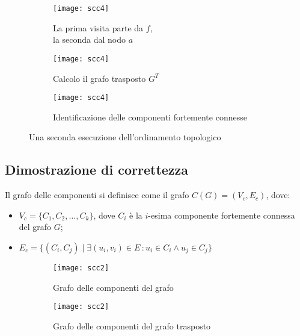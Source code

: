 \begin{figure}[H]\centering
	\begin{subfigure}[t]{.3\textwidth}
		\texttt{[image: scc4]}
		\caption{La prima visita parte da \(f\),\\la seconda dal nodo \(a\)}
	\end{subfigure}\hfill
	\begin{subfigure}[t]{.3\textwidth}
		\texttt{[image: scc4]}
		\caption{Calcolo il grafo trasposto \(G^T\)}
	\end{subfigure}\hfill
	\begin{subfigure}[t]{.3\textwidth}
		\texttt{[image: scc4]}
		\caption{Identificazione delle componenti fortemente connesse}
	\end{subfigure}
	\caption[]{Una seconda esecuzione dell'ordinamento topologico}
\end{figure}

\clearpage
\subsection{Dimostrazione di correttezza}

\begin{definition}
Il grafo delle componenti si definisce come il grafo \(C(G) = (V_c, E_c)\), dove:
\begin{itemize}
	\item \(V_c = \{C_1, C_2, \dots, C_k\}\), dove \(C_i\) è la \(i\)-esima componente fortemente connessa del grafo \(G\);
	\item \(E_c = \{(C_i, C_j) \mid \exists (u_i, v_i) \in E \,\colon u_i \in C_i \land u_j \in C_j\}\)
\end{itemize}
\end{definition}

\begin{figure}[H]
	\hfill
	\begin{subfigure}{.4\textwidth}
		\texttt{[image: scc2]}
		\caption{Grafo delle componenti del grafo}
	\end{subfigure}\hfill
	\begin{subfigure}{.4\textwidth}
		\texttt{[image: scc2]}
		\caption{Grafo delle componenti del grafo trasposto}
	\end{subfigure}
	\hfill\null
	\caption[Grafo delle componenti del grafo e del grafo trasposto]{}
\end{figure}


